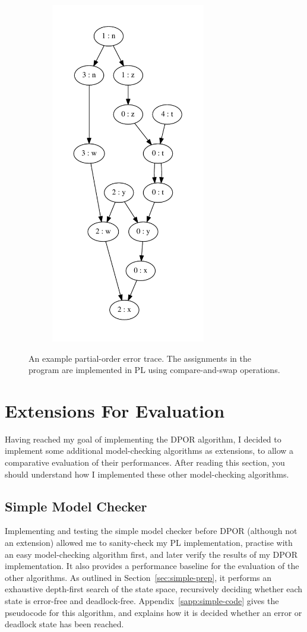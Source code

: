 \documentclass[12pt,a4paper,twoside,openany]{report}
\begin{document}
\begin{figure}
\begin{subfigure}{0.5\textwidth}
		\includegraphics[height=15cm]{error_trace}
	\end{subfigure}
	\caption[An example partial-order
	error trace.]{An example partial-order
		error trace. The assignments in
		the program are implemented in PL
		using compare-and-swap operations.}
	\label{fig:trace-example}
\end{figure}

\section{Extensions For Evaluation}
Having reached my goal of implementing
the DPOR algorithm, I decided to
implement some additional model-checking
algorithms as extensions, to allow a
comparative evaluation of their
performances. After reading this
section, you should understand how
I implemented these other model-checking
algorithms.

\subsection{Simple Model Checker}
\label{sec:simple-imp}
Implementing and testing
the simple model checker
before DPOR
(although not an extension)
allowed me to
sanity-check my PL implementation,
practise with an easy
model-checking algorithm first,
and later verify the results of
my DPOR implementation.
It also provides a performance
baseline for the evaluation of
the other algorithms.
As outlined in
Section~\ref{sec:simple-prep}, it
performs an exhaustive depth-first
search of the state space,
recursively deciding whether each
state is error-free
and deadlock-free.
Appendix~\ref{sapp:simple-code} gives
the pseudocode for this algorithm,
and explains how it is decided whether
an error or deadlock state has been reached.
\end{document}
